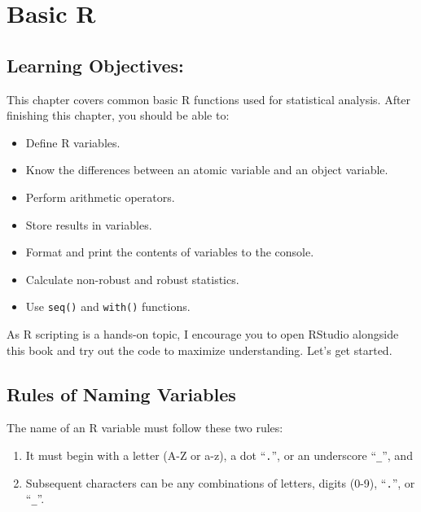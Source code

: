 \documentclass[
  letterpaper,
]{book}
\begin{document}
\chapter*{Basic R}\label{basic-r}


\section*{Learning Objectives:}\label{learning-objectives}


This chapter covers common basic R functions used for statistical
analysis. After finishing this chapter, you should be able to:

\begin{itemize}
\item
  Define R variables.
\item
  Know the differences between an atomic variable and an object
  variable.
\item
  Perform arithmetic operators.
\item
  Store results in variables.
\item
  Format and print the contents of variables to the console.
\item
  Calculate non-robust and robust statistics.
\item
  Use \texttt{seq()} and \texttt{with()} functions.
\end{itemize}

As R scripting is a hands-on topic, I encourage you to open RStudio
alongside this book and try out the code to maximize understanding.
Let's get started.

\section*{Rules of Naming Variables}\label{rules-of-naming-variables}


The name of an R variable must follow these two rules:

\begin{enumerate}
\def\labelenumi{\arabic{enumi}.}
\item
  It must begin with a letter (A-Z or a-z), a dot ``\texttt{.}'', or an
  underscore ``\texttt{\_}'', and
\item
  Subsequent characters can be any combinations of letters, digits
  (0-9), ``\texttt{.}'', or ``\texttt{\_}''.
\end{enumerate}
\end{document}
